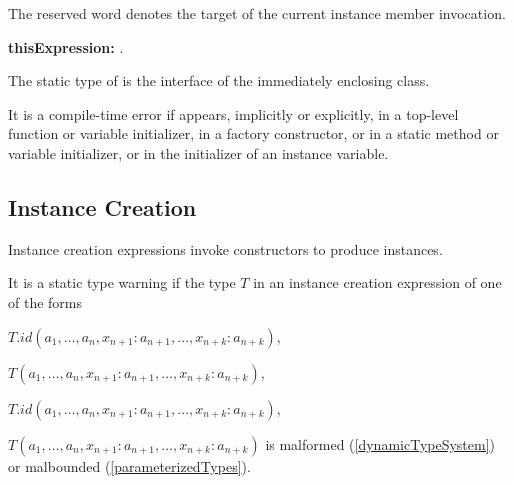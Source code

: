 \documentclass{article}
\begin{document}
\LMHash{}
The reserved word \THIS{} denotes the target of the current instance member invocation.

\begin{grammar}
{\bf thisExpression:}\THIS{}
  .
\end{grammar}

\LMHash{}
The static type of \THIS{} is the interface of the immediately enclosing class.


\LMHash{}
It is a compile-time error if \THIS{} appears, implicitly or explicitly, in a top-level function or variable initializer, in a factory constructor, or in a static method or variable initializer, or in the initializer of an instance variable.


\subsection{Instance Creation}

\LMHash{}
Instance creation expressions invoke constructors to produce instances.



\LMHash{}
It is a static type warning if
the type $T$ in an instance creation expression of one of the forms

\NEW{} $T.id(a_1, \ldots , a_n, x_{n+1}: a_{n+1}, \ldots , x_{n+k}: a_{n+k})$,

\NEW{} $T(a_1, \ldots , a_n, x_{n+1}: a_{n+1}, \ldots , x_{n+k}: a_{n+k})$,

\CONST{} $T.id(a_1, \ldots , a_n, x_{n+1}: a_{n+1}, \ldots , x_{n+k}: a_{n+k})$,

\CONST{} $T(a_1, \ldots , a_n, x_{n+1}: a_{n+1}, \ldots , x_{n+k}: a_{n+k})$ is malformed (\ref{dynamicTypeSystem}) or malbounded (\ref{parameterizedTypes}).
\end{document}
